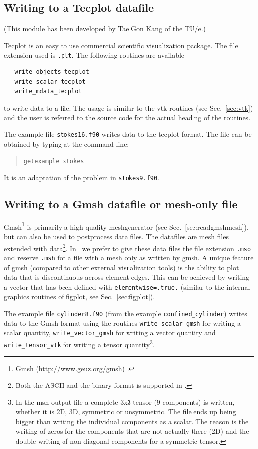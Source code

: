 \subsection{Writing to a Tecplot datafile}
\label{sec:tec}

(This module has been developed by Tae Gon Kang of the TU/e.)

Tecplot is an easy to use commercial
scientific visualization package.
The file extension used is \texttt{.plt}. The following routines are available
\begin{verbatim}
   write_objects_tecplot
   write_scalar_tecplot
   write_mdata_tecplot
\end{verbatim}
to write data to a file. The usage is similar to the vtk-routines (see
Sec.~\ref{sec:vtk}) and the user is referred to the source code for the actual
heading of the routines.

The example file \texttt{stokes16.f90} writes data to the tecplot
format. The file can be obtained by typing at the
command line:
\begin{quote}
   \texttt{getexample stokes}
\end{quote}
It is an adaptation of the problem in \texttt{stokes9.f90}.

\subsection{Writing to a Gmsh datafile or mesh-only file}
\label{sec:gmshwrite}

Gmsh\footnote{Gmsh
(\href{http://www.geuz.org/gmsh}{http://www.geuz.org/gmsh})
 \cite{Geuzaine09}.} is primarily a high quality meshgenerator (see
Sec.~\ref{sec:readgmshmesh}), but can also be used to postprocess data files.
The datafiles are mesh files extended with data\footnote{Both the ASCII
and the binary format is supported in \tfem.}.
In \tfem\ we prefer to give these data files the file extension
\texttt{.mso} and reserve \texttt{.msh} for a file with a mesh only as written by gmsh.
A unique feature of gmsh (compared
to other external visualization tools) is the
ability to plot data that is discontinuous across element edges. This
can be achieved by writing a vector that has been defined with
\texttt{elementwise=.true.} (similar to
the internal graphics routines of figplot, see Sec.~\ref{sec:figplot}).

The example file \texttt{cylinder8.f90} (from the example
\texttt{confined\_cylinder}) writes data to the Gmsh format using the
routines \texttt{write\_scalar\_gmsh} for writing a scalar
quantity, \texttt{write\_vector\_gmsh} for writing a vector quantity
and \texttt{write\_tensor\_vtk} for writing a tensor
quantity\footnote{In the msh output file a complete 3x3 tensor (9 components)
is written, whether it is 2D, 3D, symmetric or unsymmetric.
The file ends up being bigger than writing the individual components as a
scalar. The reason is the writing of zeros for the components that
are not actually there (2D) and the double writing of non-diagonal components
for a symmetric tensor.}.

